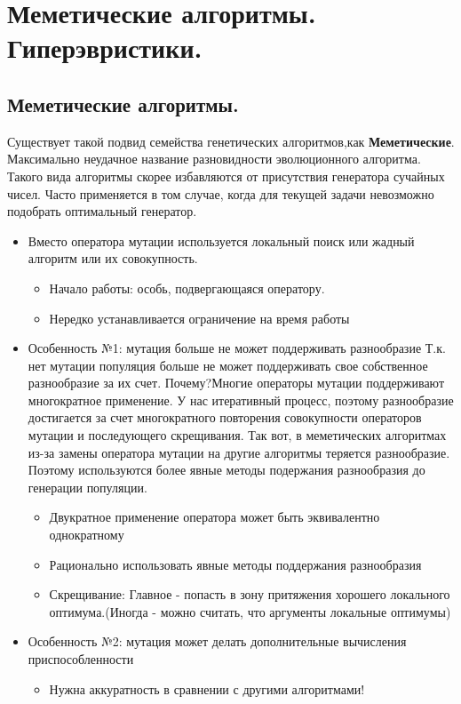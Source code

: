 \section{Меметические алгоритмы. Гиперэвристики.}
\subsection{Меметические алгоритмы.}
Существует такой подвид семейства генетических алгоритмов,как \textbf{Меметические}. Максимально неудачное название разновидности эволюционного алгоритма. Такого вида алгоритмы скорее избавляются от присутствия генератора сучайных чисел. Часто применяется в том случае, когда для текущей задачи невозможно подобрать оптимальный генератор.
\begin{itemize}
    \item Вместо оператора мутации используется локальный поиск или жадный алгоритм или их совокупность.
    \begin{itemize}
        \item Начало работы: особь, подвергающаяся оператору. 
        \item Нередко устанавливается ограничение на время работы
    \end{itemize}
    \item Особенность №1: мутация больше не может поддерживать разнообразие
        Т.к. нет мутации популяция больше не может поддерживать свое собственное разнообразие за их счет. Почему?Многие операторы мутации поддерживают многократное применение. У нас итеративный процесс, поэтому разнообразие достигается за счет многократного повторения совокупности операторов мутации и последующего скрещивания. Так вот, в меметических алгоритмах из-за замены оператора мутации на другие алгоритмы теряется разнообразие. Поэтому используются более явные методы подержания разнообразия до генерации популяции.
        \begin{itemize}
        \item Двукратное применение оператора может быть эквивалентно однократному
        \item Рационально использовать явные методы поддержания разнообразия
        \item Скрещивание: Главное - попасть в зону притяжения хорошего локального оптимума.(Иногда - можно считать, что аргументы локальные оптимумы)
    \end{itemize}
    \item Особенность №2: мутация может делать дополнительные вычисления приспособленности
    \begin{itemize}
    \item Нужна аккуратность в сравнении с другими алгоритмами!
    \end{itemize}
\end{itemize}
